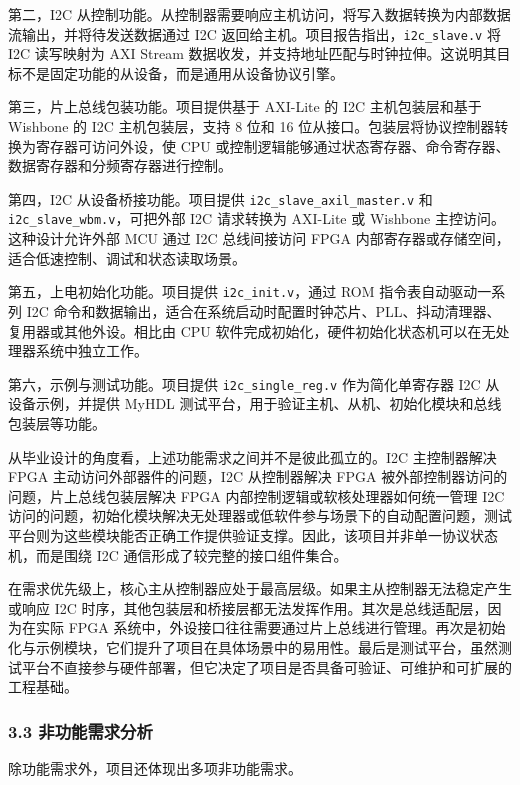 第二，I2C 从控制功能。从控制器需要响应主机访问，将写入数据转换为内部数据流输出，并将待发送数据通过 I2C 返回给主机。项目报告指出，\texttt{i2c\_slave.v} 将 I2C 读写映射为 AXI Stream 数据收发，并支持地址匹配与时钟拉伸。这说明其目标不是固定功能的从设备，而是通用从设备协议引擎。

第三，片上总线包装功能。项目提供基于 AXI-Lite 的 I2C 主机包装层和基于 Wishbone 的 I2C 主机包装层，支持 8 位和 16 位从接口。包装层将协议控制器转换为寄存器可访问外设，使 CPU 或控制逻辑能够通过状态寄存器、命令寄存器、数据寄存器和分频寄存器进行控制。

第四，I2C 从设备桥接功能。项目提供 \texttt{i2c\_slave\_axil\_master.v} 和 \texttt{i2c\_slave\_wbm.v}，可把外部 I2C 请求转换为 AXI-Lite 或 Wishbone 主控访问。这种设计允许外部 MCU 通过 I2C 总线间接访问 FPGA 内部寄存器或存储空间，适合低速控制、调试和状态读取场景。

第五，上电初始化功能。项目提供 \texttt{i2c\_init.v}，通过 ROM 指令表自动驱动一系列 I2C 命令和数据输出，适合在系统启动时配置时钟芯片、PLL、抖动清理器、复用器或其他外设。相比由 CPU 软件完成初始化，硬件初始化状态机可以在无处理器系统中独立工作。

第六，示例与测试功能。项目提供 \texttt{i2c\_single\_reg.v} 作为简化单寄存器 I2C 从设备示例，并提供 MyHDL 测试平台，用于验证主机、从机、初始化模块和总线包装层等功能。

从毕业设计的角度看，上述功能需求之间并不是彼此孤立的。I2C 主控制器解决 FPGA 主动访问外部器件的问题，I2C 从控制器解决 FPGA 被外部控制器访问的问题，片上总线包装层解决 FPGA 内部控制逻辑或软核处理器如何统一管理 I2C 访问的问题，初始化模块解决无处理器或低软件参与场景下的自动配置问题，测试平台则为这些模块能否正确工作提供验证支撑。因此，该项目并非单一协议状态机，而是围绕 I2C 通信形成了较完整的接口组件集合。

在需求优先级上，核心主从控制器应处于最高层级。如果主从控制器无法稳定产生或响应 I2C 时序，其他包装层和桥接层都无法发挥作用。其次是总线适配层，因为在实际 FPGA 系统中，外设接口往往需要通过片上总线进行管理。再次是初始化与示例模块，它们提升了项目在具体场景中的易用性。最后是测试平台，虽然测试平台不直接参与硬件部署，但它决定了项目是否具备可验证、可维护和可扩展的工程基础。

\subsubsection{3.3 非功能需求分析}\label{ux975eux529fux80fdux9700ux6c42ux5206ux6790}

除功能需求外，项目还体现出多项非功能需求。

